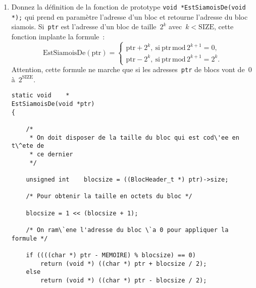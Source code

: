 \begin{enumerate}
\begin{correction}
\begin{verbatim}
	return (void *) ((char *) ptr + sizeof(BlocHeader_t));
}
\end{verbatim}
\end{correction}
\fi
\item Donnez la d\'efinition de la fonction de prototype %
  \verb+void *EstSiamoisDe(void *);+
  qui prend en param\`etre l'adresse d'un bloc et retourne l'adresse
  du bloc siamois. Si~\verb+ptr+ est l'adresse d'un bloc de
  taille~$2^k$ avec~${k<\mathrm{SIZE}}$, cette fonction implante la
  formule~:
  $$
  \mathrm{EstSiamoisDe}(\mathrm{ptr}) =
  \left\lbrace
    \begin{array}{l}
      \mathrm{ptr} + 2^{k}, \ \mathrm{si}\ \mathrm{ptr}\, \mathrm{mod}\, 2^{k+1} = 0,\\
      \mathrm{ptr} - 2^{k}, \ \mathrm{si}\ \mathrm{ptr}\, \mathrm{mod}\,  2^{k+1} = 2^{k}.
    \end{array}
  \right.
  $$
  Attention, cette formule ne marche que si les adresses~\verb+ptr+
  de blocs vont de~$0$ \`a~$2^{\mathrm{SIZE}}$.
\ifcorrection
\begin{correction}
\begin{verbatim}
static void    *
EstSiamoisDe(void *ptr)
{

	/*
	 * On doit disposer de la taille du bloc qui est cod\'ee en t\^ete de
	 * ce dernier
	 */

	unsigned int    blocsize = ((BlocHeader_t *) ptr)->size;

	/* Pour obtenir la taille en octets du bloc */

	blocsize = 1 << (blocsize + 1);

	/* On ram\`ene l'adresse du bloc \`a 0 pour appliquer la formule */

	if ((((char *) ptr - MEMOIRE) % blocsize) == 0)
		return (void *) ((char *) ptr + blocsize / 2);
	else
		return (void *) ((char *) ptr - blocsize / 2);


\end{verbatim}
\end{correction}
\end{enumerate}
